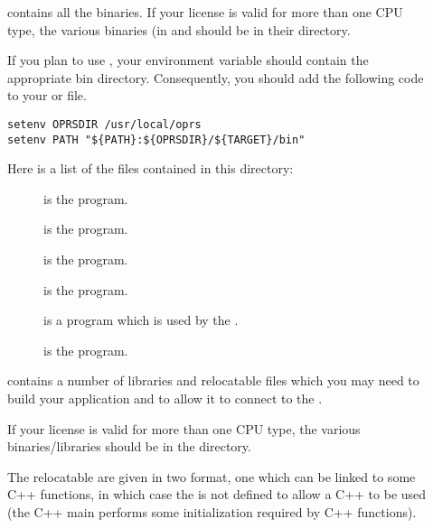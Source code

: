 \begin{description}

\item [] contains all the binaries. If your license is valid for more
than one CPU type, the various binaries (in  and  should be
in their  directory. 

If you plan to use \COPRSDE{}, your  environment variable should
contain the appropriate bin directory.  Consequently, you should add the
following code to your  or  file.

\begin{verbatim}
setenv OPRSDIR /usr/local/oprs
setenv PATH "${PATH}:${OPRSDIR}/${TARGET}/bin"
\end{verbatim}

Here is a list of the files contained in this directory:

\begin{description}

\item [] is the \CPK{} program.

\item [] is the \OPRSS{} program.

\item [] is the \XPK{} program.

\item [] is the \MP{} program.

\item [] is a program which is used by the \XPK{}.

\item [] is the \OPE{} program.

\end{description}

\item [] contains a number of libraries and relocatable files which
you may need to build your application and to allow it to connect to the \MP{}.

If your license is valid for more than one CPU type, the various
binaries/libraries should be in the  directory.

The relocatable are given in two format, one which can be linked to some C++
functions, in which case the  is not defined to allow a C++
 to be used (the C++ main performs some initialization required by
C++ functions).


\end{description}
